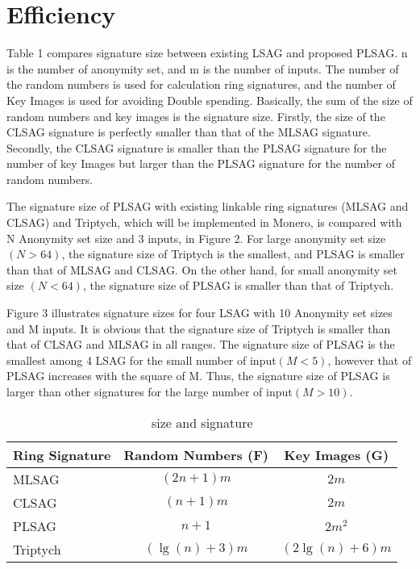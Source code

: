 \section{Efficiency}

    Table 1 compares signature size between existing LSAG and proposed PLSAG. n is the number of anonymity set, and m is the number of inputs. The number of the random numbers is used for calculation ring signatures, and the number of Key Images is used for avoiding Double spending. Basically, the sum of the size of random numbers and key images is the signature size. Firstly, the size of the CLSAG signature is perfectly smaller than that of the MLSAG signature. Secondly, the CLSAG signature is smaller than the PLSAG signature for the number of key Images but larger than the PLSAG signature for the number of random numbers.
    
    The signature size of PLSAG with existing linkable ring signatures (MLSAG and CLSAG) and Triptych, which will be implemented in Monero, is compared with N Anonymity set size and 3 inputs, in Figure 2. For large anonymity set size $(N>64)$, the signature size of Triptych is the smallest, and PLSAG is smaller than that of MLSAG and CLSAG. On the other hand, for small anonymity set size $(N<64)$, the signature size of PLSAG is smaller than that of Triptych.
    
    Figure 3 illustrates signature sizes for four LSAG with 10 Anonymity set sizes and M inputs. It is obvious that the signature size of Triptych is smaller than that of CLSAG and MLSAG in all ranges. The signature size of PLSAG is the smallest among 4 LSAG for the small number of input$(M<5)$, however that of PLSAG increases with the square of M. Thus, the signature size of PLSAG is larger than other signatures for the large number of input$(M>10)$.
    
    \begin{table}[hbtp]  %
        \caption{size and signature}
        \label{table:data_type}
        \centering
        \begin{tabular}{|l|cc|}
            \hline
            Ring Signature  & Random Numbers (F) &  Key Images (G) \\
            \hline
            MLSAG  & $(2n+1)m$  & $2m$ \\
            CLSAG  & $(n+1)m$   & $2m$ \\
            PLSAG  & $n+1$  & $2m^2$ \\
            Triptych  & $(\lg (n)+3)m$   &  $(2\lg (n)+6)m$ \\
            \hline
        \end{tabular}
    \end{table}
    
